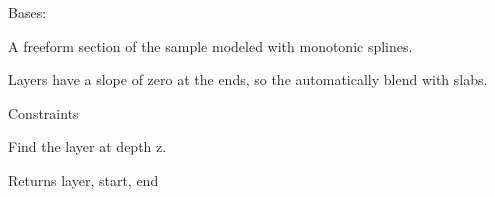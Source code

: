 \documentclass[letterpaper,10pt,english]{sphinxmanual}
\begin{document}
\begin{fulllineitems}
\label{api/freeform:refl1d.freeform.FreeInterface}
Bases: {\hyperref[api/model:refl1d.model.Layer]{}}

A freeform section of the sample modeled with monotonic splines.

Layers have a slope of zero at the ends, so the automatically blend
with slabs.

\begin{fulllineitems}
\label{api/freeform:refl1d.freeform.FreeInterface.constraints}
Constraints

\end{fulllineitems}


\begin{fulllineitems}
\label{api/freeform:refl1d.freeform.FreeInterface.find}
Find the layer at depth z.

Returns layer, start, end

\end{fulllineitems}


\begin{fulllineitems}
\label{api/freeform:refl1d.freeform.FreeInterface.parameters}
\end{fulllineitems}


\begin{fulllineitems}
\label{api/freeform:refl1d.freeform.FreeInterface.render}
\end{fulllineitems}


\begin{fulllineitems}
\label{api/freeform:refl1d.freeform.FreeInterface.thickness}
\end{fulllineitems}


\end{fulllineitems}
\end{document}
